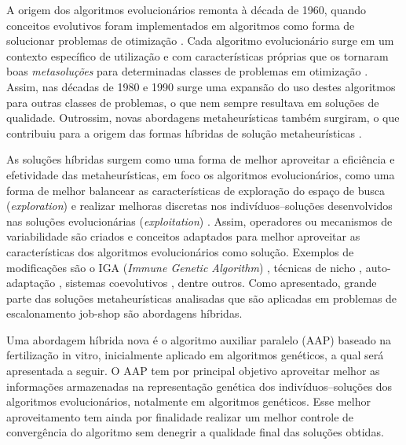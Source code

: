 \documentclass[relatorio,nocolorlinks]{inf-ufg}
\begin{document}
A origem dos algoritmos evolucion\'{a}rios remonta \`{a} d\'{e}cada de 1960, quando conceitos evolutivos foram implementados em algoritmos como
forma de solucionar problemas de otimiza\c{c}\~{a}o \cite{DeJong2006}. Cada algoritmo evolucion\'{a}rio surge em um contexto espec\'{i}fico de
utiliza\c{c}\~{a}o e com caracter\'{i}sticas pr\'{o}prias que os tornaram boas \textit{metasolu\c{c}\~{o}es} para determinadas classes de problemas
em otimiza\c{c}\~{a}o \cite{DeJong2006} \cite{Gendreau2010}. Assim, nas d\'{e}cadas de 1980 e 1990 surge uma expans\~{a}o do uso destes algoritmos
para outras classes de problemas, o que nem sempre resultava em solu\c{c}\~{o}es de qualidade. Outrossim, novas abordagens metaheur\'{i}sticas
tamb\'{e}m surgiram, o que contribuiu para a origem das formas h\'{i}bridas de solu\c{c}\~{a}o metaheur\'{i}sticas \cite{DeJong2006}
\cite{Gendreau2010}.

As solu\c{c}\~{o}es h\'{i}bridas surgem como uma forma de melhor aproveitar a efici\^{e}ncia e efetividade das metaheur\'{i}sticas, em foco os
algoritmos evolucion\'{a}rios, como uma forma de melhor balancear as caracter\'{i}sticas de explora\c{c}\~{a}o do espa\c{c}o de busca
(\textit{exploration}) e realizar melhoras discretas nos indiv\'{i}duos--solu\c{c}\~{o}es desenvolvidos nas solu\c{c}\~{o}es evolucion\'{a}rias
(\textit{exploitation}) \cite{Camilo2010} \cite{Gendreau2010}. Assim, operadores ou mecanismos de variabilidade s\~{a}o criados e conceitos
adaptados para melhor aproveitar as caracter\'{i}sticas dos algoritmos evolucion\'{a}rios como solu\c{c}\~{a}o. Exemplos de modifica\c{c}\~{o}es
s\~{a}o o IGA (\textit{Immune Genetic Algorithm}) \cite{Ma2010}, t\'{e}cnicas de nicho \cite{Camilo2010}, auto-adapta\c{c}\~{a}o \cite{DeJong2006},
sistemas coevolutivos \cite{DeJong2006}, dentre outros. Como apresentado, grande parte das solu\c{c}\~{o}es metaheur\'{i}sticas analisadas que
s\~{a}o aplicadas em problemas de escalonamento job-shop s\~{a}o abordagens h\'{i}bridas.

Uma abordagem h\'{i}brida nova \'{e} o algoritmo auxiliar paralelo (AAP) baseado na fertiliza\c{c}\~{a}o in vitro, inicialmente aplicado em
algoritmos gen\'{e}ticos, a qual ser\'{a} apresentada a seguir. O AAP tem por principal objetivo aproveitar melhor as informa\c{c}\~{o}es
armazenadas na representa\c{c}\~{a}o gen\'{e}tica dos indiv\'{i}duos--solu\c{c}\~{o}es dos algoritmos evolucion\'{a}rios, notalmente em algoritmos
gen\'{e}ticos. Esse melhor aproveitamento tem ainda por finalidade realizar um melhor controle de converg\^{e}ncia do algoritmo sem denegrir a
qualidade final das solu\c{c}\~{o}es obtidas.
\end{document}
